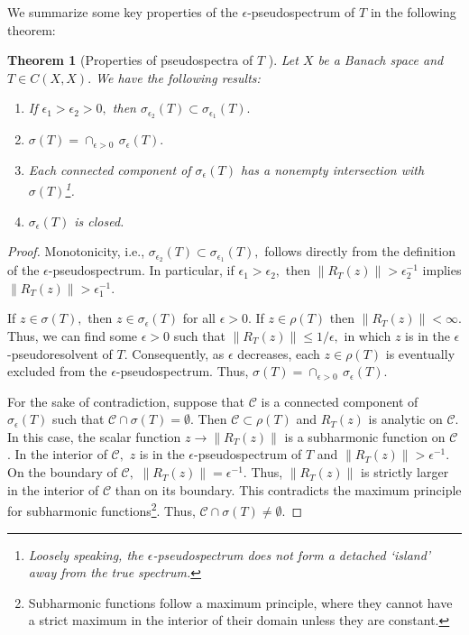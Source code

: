 \documentclass[12pt,a4paper]{article}
\theoremstyle{boldthm}
\newtheorem{theorem}{Theorem}[section]
\theoremstyle{bolddefn}
\begin{document}
We summarize some key properties of the $\epsilon$-pseudospectrum of $T$ in the following theorem:
\begin{theorem}[{Properties of pseudospectra of $T$ \cite[Lecture 2]{umberto}}]
    Let $X$ be a Banach space and $T \in C(X, X).$ We have the following results:
    \begin{enumerate}[label=(\alph*)]
        \item If $\epsilon_1 > \epsilon_2 > 0,$ then $\sigma_{\epsilon_2}(T) \subset \sigma_{\epsilon_1}(T).$
    \item $\sigma(T) = \cap_{\epsilon > 0} \, \sigma_{\epsilon}(T).$
    \item Each connected component of $\sigma_{\epsilon}(T)$ has a nonempty intersection with $\sigma(T)$\footnote{Loosely speaking, the $\epsilon$-pseudospectrum does not form a detached `island' away from the true spectrum.}.
    \item $\sigma_{\epsilon}(T)$ is closed.
    \end{enumerate}
\end{theorem}
\begin{proof}
    Monotonicity, i.e., $\sigma_{\epsilon_2}(T) \subset \sigma_{\epsilon_1}(T),$ follows directly from the definition of the $\epsilon$-pseudospectrum. In particular, if $\epsilon_1 > \epsilon_2,$ then $\|R_T(z) \| > \epsilon_2^{-1}$ implies $\|R_T(z) \| > \epsilon_1^{-1}.$

    If $z \in \sigma(T),$ then $z \in \sigma_{\epsilon}(T)$ for all $\epsilon > 0.$ If $z \in \rho(T)$ then $\| R_T(z) \| < \infty.$ Thus, we can find some $\epsilon > 0$ such that $\| R_T(z) \| \le 1/\epsilon,$ in which $z$ is in the $\epsilon$-pseudoresolvent of $T.$ Consequently, as $\epsilon$ decreases, each $z \in \rho(T)$ is eventually excluded from the $\epsilon$-pseudospectrum. Thus, $\sigma(T) = \cap_{\epsilon > 0} \, \sigma_{\epsilon}(T).$

    For the sake of contradiction, suppose that $\mathcal{C}$ is a connected component of $\sigma_{\epsilon}(T)$ such that $\mathcal{C} \cap \sigma(T) = \emptyset.$ Then $\mathcal{C} \subset \rho(T)$ and $R_T(z)$ is analytic on $\mathcal{C}.$ In this case, the scalar function $z \rightarrow \| R_T(z) \|$ is a subharmonic function on $\mathcal{C}$ \cite{umberto}. In the interior of $\mathcal{C},$ $z$ is in the $\epsilon$-pseudospectrum of $T$ and $\| R_T(z) \| > \epsilon^{-1}.$ On the boundary of $\mathcal{C},$ $\| R_T(z) \| = \epsilon^{-1}.$ Thus, $\| R_T(z) \|$ is strictly larger in the interior of $\mathcal{C}$ than on its boundary. This contradicts the maximum principle for subharmonic functions\footnote{Subharmonic functions follow a maximum principle, where they cannot have a strict maximum in the interior of their domain unless they are constant.}. Thus, $\mathcal{C} \cap \sigma(T) \ne \emptyset.$

    \end{proof}
\end{document}
